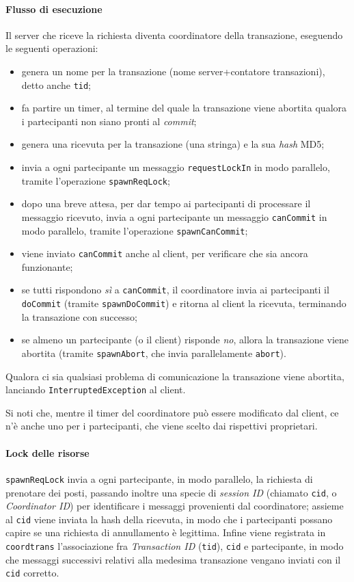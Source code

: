 \documentclass[a4paper]{article}
\begin{document}
\paragraph{Flusso di esecuzione}Il server che riceve la richiesta diventa coordinatore della transazione, eseguendo le seguenti operazioni:
\begin{itemize}
	\item genera un nome per la transazione (nome server+contatore transazioni), detto anche \texttt{tid};
	\item fa partire un timer, al termine del quale la transazione viene abortita qualora i partecipanti non siano pronti al \textit{commit};
	\item genera una ricevuta per la transazione (una stringa) e la sua \textit{hash} MD5;
	\item invia a ogni partecipante un messaggio \texttt{requestLockIn} in modo parallelo, tramite l'operazione \texttt{spawnReqLock};
	\item dopo una breve attesa, per dar tempo ai partecipanti di processare il messaggio ricevuto, invia a ogni partecipante un messaggio \texttt{canCommit} in modo parallelo, tramite l'operazione \texttt{spawnCanCommit};
	\item viene inviato \texttt{canCommit} anche al client, per verificare che sia ancora funzionante;
	\item se tutti rispondono \textit{sì} a \texttt{canCommit}, il coordinatore invia ai partecipanti il \texttt{doCommit} (tramite \texttt{spawnDoCommit}) e ritorna al client la ricevuta, terminando la transazione con successo;
	\item se almeno un partecipante (o il client) risponde \textit{no}, allora la transazione viene abortita (tramite \texttt{spawnAbort}, che invia parallelamente \texttt{abort}).
\end{itemize}

Qualora ci sia qualsiasi problema di comunicazione la transazione viene abortita, lanciando \texttt{InterruptedException} al client. 

Si noti che, mentre il timer del coordinatore può essere modificato dal client, ce n'è anche uno per i partecipanti, che viene scelto dai rispettivi proprietari.

\paragraph{Lock delle risorse}\texttt{spawnReqLock} invia a ogni partecipante, in modo parallelo, la richiesta di prenotare dei posti, passando inoltre una specie di \textit{session ID} (chiamato \texttt{cid}, o \textit{Coordinator ID}) per identificare i messaggi provenienti dal coordinatore; %
assieme al \texttt{cid} viene inviata la hash della ricevuta, in modo che i partecipanti possano capire se una richiesta di annullamento è legittima. %
Infine viene registrata in \texttt{coordtrans} l'associazione fra \textit{Transaction ID} (\texttt{tid}), \texttt{cid} e partecipante, in modo che messaggi successivi relativi alla medesima transazione vengano inviati con il \texttt{cid} corretto.
\end{document}
